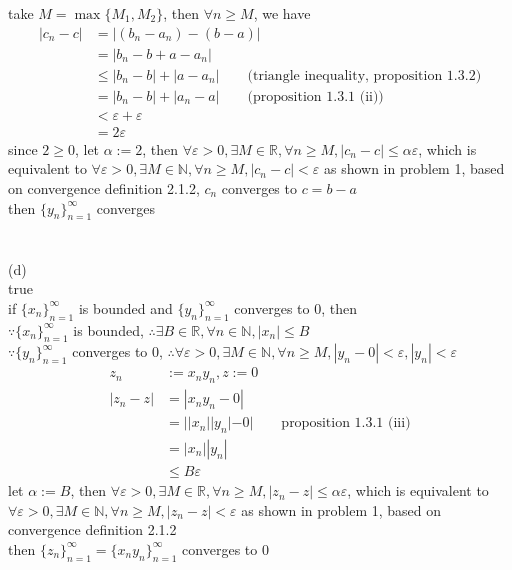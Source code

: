\documentclass[12pt, border = 4pt, multi]{article} %
\begin{document}
take $M = \max\{M_1, M_2\}$, then $\forall n \geq M$, we have
\begin{align*}
|c_n - c| &= |(b_n - a_n) - (b - a)|\\
&= |b_n - b + a - a_n|\\
&\leq |b_n - b| + |a - a_n| \qquad \text{(triangle inequality, proposition 1.3.2)}\\
&= |b_n - b| + |a_n - a| \qquad \text{(proposition 1.3.1 (ii))}\\
&< \varepsilon + \varepsilon\\
&= 2\varepsilon
\end{align*}
since $2 \geq 0$, let $\alpha := 2$, then $\forall \varepsilon > 0, \exists M \in \mathbb{R}, \forall n \geq M, |c_n - c| \leq \alpha\varepsilon$, which is equivalent to $\forall \varepsilon > 0, \exists M \in \mathbb{N}, \forall n \geq M, |c_n - c| < \varepsilon$ as shown in problem 1, based on convergence definition 2.1.2, $c_n$ converges to $c = b - a$\\
then $\{y_n\}_{n = 1} ^ {\infty}$ converges\\
\\
\\
(d)\\
true\\
if $\{x_n\}_{n = 1} ^ {\infty}$ is bounded and $\{y_n\}_{n = 1} ^ {\infty}$ converges to 0, then\\
$\because \{x_n\}_{n = 1} ^ {\infty}$ is bounded, $\therefore \exists B \in \mathbb{R}, \forall n \in \mathbb{N}, |x_n| \leq B$\\
$\because \{y_n\}_{n = 1} ^ {\infty}$ converges to 0, $\therefore \forall \varepsilon > 0, \exists M \in \mathbb{N}, \forall n \geq M, |y_n - 0| < \varepsilon, |y_n| < \varepsilon$
\begin{align*}
z_n &:= x_n y_n, z := 0\\
|z_n - z| &= |x_n y_n - 0|\\
&= ||x_n||y_n| - 0| \qquad \text{proposition 1.3.1 (iii)}\\
&= |x_n||y_n|\\
&\leq B\varepsilon
\end{align*}
let $\alpha := B$, then $\forall \varepsilon > 0, \exists M \in \mathbb{R}, \forall n \geq M, |z_n - z| \leq \alpha\varepsilon$, which is equivalent to $\forall \varepsilon > 0, \exists M \in \mathbb{N}, \forall n \geq M, |z_n - z| < \varepsilon$ as shown in problem 1, based on convergence definition 2.1.2\\
then $\{z_n\}_{n = 1} ^ {\infty} = \{x_n y_n\}_{n = 1} ^ {\infty}$ converges to 0\\
\end{document}
